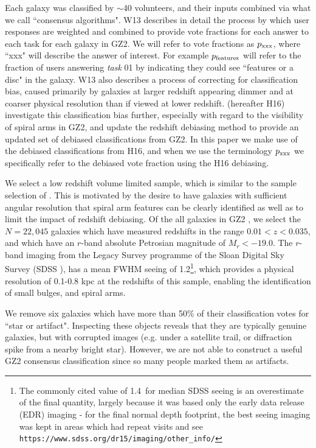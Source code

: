 \documentclass[usenatbib]{mn2e}
\begin{document}
Each galaxy was classified by $\sim$40 volunteers, and their inputs combined via what we call ``consensus algorithms". W13 describes in detail the process by which user responses are weighted and combined to provide vote fractions for each answer to each task for each galaxy in GZ2. We will refer to vote fractions as $p_{\rm xxx}$, where ``xxx" will describe the answer of interest. For example $p_{\rm features}$ will refer to the fraction of users answering {\it task} 01 by indicating they could see ``features or a disc" in the galaxy. W13 also describes a process of correcting for classification bias, caused primarily by galaxies at larger redshift appearing dimmer and at coarser physical resolution than if viewed at lower redshift. \citet{Hart2016} (hereafter H16) investigate this classification bias further, especially with regard to the visibility of spiral arms in GZ2, and update the redshift debiasing method to provide an updated set of debiased classifications from GZ2. In this paper we make use of the debiased classifications from H16, and when we use the terminology $p_{\rm xxx}$ we specifically refer to the debiased vote fraction using the H16 debiasing.

We select a low redshift volume limited sample, which is similar to the sample selection of \citet{Hart2016, Hart2017}. This is motivated by the desire to have galaxies with sufficient angular resolution that spiral arm features can be clearly identified as well as to limit the impact of redshift debiasing.  Of the all galaxies in GZ2 \citep{DR7,Strauss2002}, we select the $N=22,045$  galaxies which have measured redshifts in the range $0.01<z<0.035$, and which have an $r$-band absolute Petrosian magnitude of $M_r < -19.0$. The $r$-band imaging from the Legacy Survey programme of the Sloan Digital Sky Survey (SDSS \citealt{York2000}), has a mean FWHM seeing of 1.2\arcsec \citep{Kruk2018}\footnote{The commonly cited value of 1.4\arcsec ~for median SDSS seeing is an overestimate of the final quantity, largely because it was based only the early data release (EDR) imaging -  for the final normal depth footprint, the best seeing imaging was kept in areas which had repeat visits \citep{Ross2011} and see {\tt https://www.sdss.org/dr15/imaging/other\_info/}}, which provides a physical resolution of 0.1-0.8 kpc at the redshifts of this sample, enabling the identification of small bulges, and spiral arms. 

 We remove {six} galaxies which have more than 50\% of their classification votes for ``star or artifact". Inspecting these objects reveals that they are typically genuine galaxies, but with corrupted images (e.g. under a satellite trail, or diffraction spike from a nearby bright star). However, we are not able to construct a useful GZ2 consensus classification since so many people marked them as artifacts.
\end{document}
